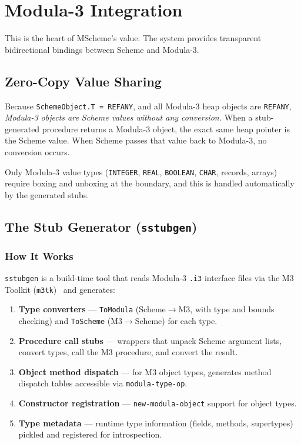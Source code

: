\documentclass[12pt]{report}
\begin{document}
\chapter{Modula-3 Integration}\label{ch:m3interop}

This is the heart of MScheme's value.  The system provides transparent
bidirectional bindings between Scheme and Modula-3.

\section{Zero-Copy Value Sharing}

Because {\tt SchemeObject.T = REFANY}, and all Modula-3 heap objects
are {\tt REFANY}, \emph{Modula-3 objects are Scheme values without any
conversion.}  When a stub-generated procedure returns a Modula-3
object, the exact same heap pointer is the Scheme value.  When Scheme
passes that value back to Modula-3, no conversion occurs.

Only Modula-3 value types ({\tt INTEGER}, {\tt REAL}, {\tt BOOLEAN},
{\tt CHAR}, records, arrays) require boxing and unboxing at the
boundary, and this is handled automatically by the generated stubs.

\section{The Stub Generator ({\tt sstubgen})}\label{sec:sstubgen}

\subsection{How It Works}

{\tt sstubgen} is a build-time tool that reads Modula-3 {\tt .i3}
interface files via the M3 Toolkit ({\tt m3tk})~\cite{m3tk} and generates:

\begin{enumerate}
\item \textbf{Type converters} --- {\tt ToModula} (Scheme$\to$M3, with
  type and bounds checking) and {\tt ToScheme} (M3$\to$Scheme) for
  each type.
\item \textbf{Procedure call stubs} --- wrappers that unpack Scheme
  argument lists, convert types, call the M3 procedure, and convert
  the result.
\item \textbf{Object method dispatch} --- for M3 object types,
  generates method dispatch tables accessible via {\tt modula-type-op}.
\item \textbf{Constructor registration} --- {\tt new-modula-object}
  support for object types.
\item \textbf{Type metadata} --- runtime type information (fields,
  methods, supertypes) pickled and registered for introspection.
\end{enumerate}
\end{document}

